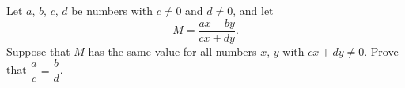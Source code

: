 Let $a$, $b$, $c$, $d$ be numbers with $c\ne0$ and $d\ne0$, and let
\[
M=\dfrac{ax+by}{cx+dy}.
\]
Suppose that $M$ has the same value for all numbers $x$, $y$ with $cx+dy\ne0$. Prove that $\dfrac {a}{c}=\dfrac {b}{d}$.
